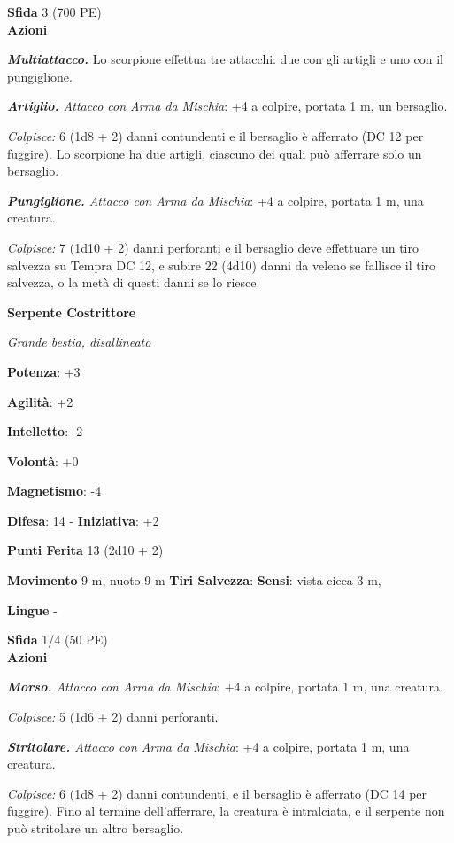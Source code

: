 \begin{multicols}{2}
\textbf{Sfida} 3 (700 PE)\smallskip\\

\smallskip\textbf{Azioni}

\emph{\textbf{Multiattacco.}} Lo scorpione effettua tre attacchi: due
con gli artigli e uno con il pungiglione.

\emph{\textbf{Artiglio.} Attacco con Arma da Mischia}: +4 a colpire,
portata 1 m, un bersaglio.

\emph{Colpisce:} 6 (1d8 + 2) danni contundenti e il bersaglio è
afferrato (DC 12 per fuggire). Lo scorpione ha due artigli, ciascuno dei
quali può afferrare solo un bersaglio.

\emph{\textbf{Pungiglione.} Attacco con Arma da Mischia}: +4 a colpire,
portata 1 m, una creatura.

\emph{Colpisce:} 7 (1d10 + 2) danni perforanti e il bersaglio deve
effettuare un tiro salvezza su Tempra DC 12, e subire 22 (4d10)
danni da veleno se fallisce il tiro salvezza, o la metà di questi danni
se lo riesce.

\textbf{Serpente Costrittore}

\emph{Grande bestia, disallineato}

\textbf{Potenza}: +3

\textbf{Agilità}: +2

\textbf{Intelletto}: -2

\textbf{Volontà}: +0

\textbf{Magnetismo}: -4

\textbf{Difesa}: 14 - \textbf{Iniziativa}: +2

\textbf{Punti Ferita} 13 (2d10 + 2)

\textbf{Movimento} 9 m, nuoto 9 m
\textbf{Tiri Salvezza}:
\textbf{Sensi}: vista cieca 3 m, 

\textbf{Lingue} -

\textbf{Sfida} 1/4 (50 PE)\smallskip\\

\smallskip\textbf{Azioni}

\emph{\textbf{Morso.} Attacco con Arma da Mischia}: +4 a colpire,
portata 1 m, una creatura.

\emph{Colpisce:} 5 (1d6 + 2) danni perforanti.

\emph{\textbf{Stritolare.} Attacco con Arma da Mischia}: +4 a colpire,
portata 1 m, una creatura.

\emph{Colpisce:} 6 (1d8 + 2) danni contundenti, e il bersaglio è
afferrato (DC 14 per fuggire). Fino al termine dell'afferrare, la
creatura è intralciata, e il serpente non può stritolare un altro
bersaglio.


\end{multicols}
